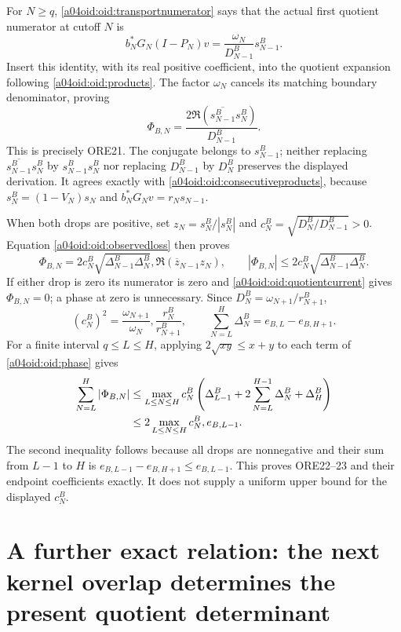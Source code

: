 \documentclass[11pt,a4paper]{article}
\begin{document}
For $N\ge q$, \eqref{a04oid:oid:transportnumerator} says that the actual
first quotient numerator at cutoff $N$ is
\[
 b_N^*G_N(I-P_N)v
 =\frac{\omega_N}{D_{N-1}^B}s_{N-1}^B.
\]
Insert this identity, with its real positive coefficient, into the
quotient expansion following \eqref{a04oid:oid:products}. The factor
$\omega_N$ cancels its matching boundary denominator, proving
\begin{equation}\label{a04oid:oid:quotientcurrent}
 \boxed{\Phi_{B,N}
 =\frac{2\Re(\overline{s_{N-1}^B}s_N^B)}{D_{N-1}^B}.}
\end{equation}
This is precisely ORE21. The conjugate belongs to $s_{N-1}^B$;
neither replacing $\overline{s_{N-1}^B}s_N^B$ by
$s_{N-1}^Bs_N^B$ nor replacing $D_{N-1}^B$ by $D_N^B$
preserves the displayed derivation. It agrees exactly with
\eqref{a04oid:oid:consecutiveproducts}, because
$s_N^B=(1-V_N)s_N$ and
$b_N^*G_Nv=r_Ns_{N-1}$.

When both drops are positive, set $z_N=s_N^B/|s_N^B|$ and
$c_N^B=\sqrt{D_N^B/D_{N-1}^B}>0$. Equation
\eqref{a04oid:oid:observedloss} then proves
\begin{equation}\label{a04oid:oid:phase}
 \Phi_{B,N}=2c_N^B\sqrt{\Delta_{N-1}^B\Delta_N^B},
 \Re(\overline z_{N-1}z_N),\qquad
 |\Phi_{B,N}|\le2c_N^B\sqrt{\Delta_{N-1}^B\Delta_N^B}.
\end{equation}
If either drop is zero its numerator is zero and
\eqref{a04oid:oid:quotientcurrent} gives $\Phi_{B,N}=0$; a phase at zero
is unnecessary. Since $D_N^B=\omega_{N+1}/r_{N+1}^B$,
\begin{equation}\label{a04oid:oid:cB}
 (c_N^B)^2=\frac{\omega_{N+1}}{\omega_N},
 \frac{r_N^B}{r_{N+1}^B},\qquad
 \sum_{N=L}^H\Delta_N^B=e_{B,L}-e_{B,H+1}.
\end{equation}
For a finite interval $q\le L\le H$, applying
$2\sqrt{xy}\le x+y$ to each term of \eqref{a04oid:oid:phase} gives
\begin{align}\label{a04oid:oid:finitebound}
 \sum_{N=L}^H|\Phi_{B,N}|
 &\le \max_{L\le N\le H}c_N^B
 \left(\Delta_{L-1}^B+2\sum_{N=L}^{H-1}\Delta_N^B+\Delta_H^B\right)
 \notag\\
 &\le 2\max_{L\le N\le H}c_N^B,e_{B,L-1}.
\end{align}
The second inequality follows because all drops are nonnegative and
their sum from $L-1$ to $H$ is $e_{B,L-1}-e_{B,H+1}\le e_{B,L-1}$.
This proves ORE22--23 and their endpoint coefficients exactly. It
does not supply a uniform upper bound for the displayed $c_N^B$.

\section{A further exact relation: the next kernel overlap determines
the present quotient determinant}
\end{document}
